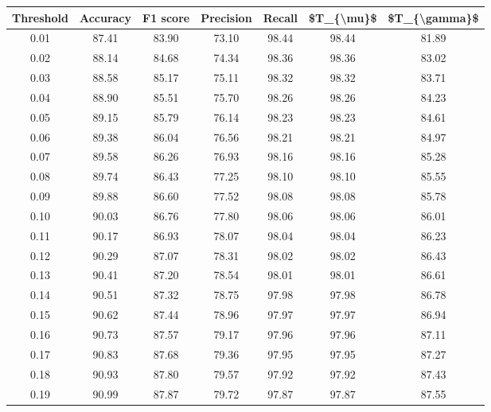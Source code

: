 \begin{tabular}{|c|c|c|c|c|c|c|}
\hline
 Threshold &  Accuracy &  F1 score &  Precision &  Recall &  \$T\_\{\textbackslash mu\}\$ &  \$T\_\{\textbackslash gamma\}\$ \\
\hline
      0.01 &     87.41 &     83.90 &      73.10 &   98.44 &      98.44 &         81.89 \\
      0.02 &     88.14 &     84.68 &      74.34 &   98.36 &      98.36 &         83.02 \\
      0.03 &     88.58 &     85.17 &      75.11 &   98.32 &      98.32 &         83.71 \\
      0.04 &     88.90 &     85.51 &      75.70 &   98.26 &      98.26 &         84.23 \\
      0.05 &     89.15 &     85.79 &      76.14 &   98.23 &      98.23 &         84.61 \\
      0.06 &     89.38 &     86.04 &      76.56 &   98.21 &      98.21 &         84.97 \\
      0.07 &     89.58 &     86.26 &      76.93 &   98.16 &      98.16 &         85.28 \\
      0.08 &     89.74 &     86.43 &      77.25 &   98.10 &      98.10 &         85.55 \\
      0.09 &     89.88 &     86.60 &      77.52 &   98.08 &      98.08 &         85.78 \\
      0.10 &     90.03 &     86.76 &      77.80 &   98.06 &      98.06 &         86.01 \\
      0.11 &     90.17 &     86.93 &      78.07 &   98.04 &      98.04 &         86.23 \\
      0.12 &     90.29 &     87.07 &      78.31 &   98.02 &      98.02 &         86.43 \\
      0.13 &     90.41 &     87.20 &      78.54 &   98.01 &      98.01 &         86.61 \\
      0.14 &     90.51 &     87.32 &      78.75 &   97.98 &      97.98 &         86.78 \\
      0.15 &     90.62 &     87.44 &      78.96 &   97.97 &      97.97 &         86.94 \\
      0.16 &     90.73 &     87.57 &      79.17 &   97.96 &      97.96 &         87.11 \\
      0.17 &     90.83 &     87.68 &      79.36 &   97.95 &      97.95 &         87.27 \\
      0.18 &     90.93 &     87.80 &      79.57 &   97.92 &      97.92 &         87.43 \\
      0.19 &     90.99 &     87.87 &      79.72 &   97.87 &      97.87 &         87.55 \\

\end{tabular}

